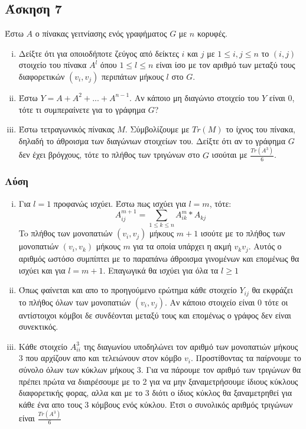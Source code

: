 \newpage\subsection*{Άσκηση 7}

Έστω $A$ ο πίνακας γειτνίασης ενός γραφήματος $G$ με $n$ κορυφές. 

\begin{enumerate}[i.]

\item
Δείξτε ότι για οποιοδήποτε ζεύγος από δείκτες $i$ και $j$ με $1 \le i,j \le n$ το $(i,j)$ στοιχείο του πίνακα $A^l$ όπου
$1 \le l \le n$ είναι ίσο με τον αριθμό των μεταξύ τους διαφορετικών $(v_i,v_j)$ περιπάτων μήκους $l$ στο $G$.

\item
Έστω $Y = A + A^2 + ... + A^{n-1}$. Αν κάποιο μη διαγώνιο στοιχείο του $Y$ είναι 0, τότε τι συμπεραίνετε για το γράφημα $G$?

\item
Έστω τετραγωνικός πίνακας $M$. Σύμβολίζουμε με $Tr(M)$ το ίχνος του πίνακα, δηλαδή το άθροισμα των διαγώνιων στοιχείων του. 
        Δείξτε ότι αν το γράφημα $G$ δεν έχει βρόγχους, τότε το πλήθος των τριγώνων στο $G$ ισούται με $\frac{Tr(A^3)}{6}$.

\end{enumerate}

\subsubsection*{Λύση}

\begin{enumerate}[i.]

\item
Για $l=1$ προφανώς ισχύει. Έστω πως ισχύει για $l=m$, τότε:
\begin{equation*}
A^{m+1}_{ij} = \sum_{1 \le k \le n} A^m_{ik}*A_{kj} 
\end{equation*}
To πλήθος των μονοπατιών $(v_i, v_j)$ μήκους $m+1$ ισούτε με το πλήθος των μονοπατιών $(v_i,v_k)$ μήκους $m$ για τα οποία
υπάρχει η ακμή $v_kv_j$. Αυτός ο αριθμός ωστόσο συμπίπτει με το παραπάνω άθροισμα γινομένων και επομένως θα ισχύει και για $l=m+1$. 
Επαγωγικά θα ισχύει για όλα τα $l \ge 1$
        
\item
Όπως φαίνεται και απο το προηγούμενο ερώτημα κάθε στοιχείο $Y_{ij}$ θα εκφράζει το πλήθος όλων των μονοπατιών $(v_i, v_j)$.
Αν κάποιο στοιχείο είναι 0 τότε οι αντίστοιχοι κόμβοι δε συνδέονται μεταξύ τους και επομένως ο γράφος δεν είναι συνεκτικός.

\item
Κάθε στοιχείο $A^3_{ii}$ της διαγωνίου υποδηλώνει τον αριθμό των μονοπατιών μήκους 3 που αρχίζουν απο και τελειώνουν στον κόμβο $v_i$.
Προστίθοντας τα παίρνουμε το σύνολο όλων των κύκλων μήκους 3. Για να πάρουμε τον αριθμό των τριγώνων θα πρέπει πρώτα να διαιρέσουμε
με το 2 για να μην ξαναμετρήσουμε ίδιους κύκλους διαφορετικής φορας, αλλα και με το 3 διότι ο ίδιος κύκλος θα ξαναμετρηθεί για κάθε ένα απο
        τους 3 κόμβους ενός κύκλου. Έτσι ο συνολικός αριθμός τριγώνων είναι $\frac{Tr(A^3)}{6}$
\end{enumerate}


